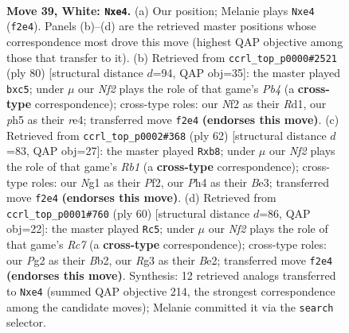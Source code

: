 \documentclass[11pt]{article}
\begin{document}
\clearpage

\begin{figure}[p]\centering
\begin{subfigure}{0.46\textwidth}\centering
\resizebox{\linewidth}{!}{%
\newchessgame
\chessboard[
  setfen={4rb2/3kn1pr/4n3/7p/P3b2P/6R1/5NP1/R2K2N1 w - - 0 39},
  showmover=false,
  pgfstyle=straightmove, color=movearrow, markmove={f2-e4}
]}
\caption{}
\end{subfigure}\hfill
\begin{subfigure}{0.46\textwidth}\centering
\resizebox{\linewidth}{!}{%
\newchessgame
\chessboard[
  setfen={6k1/6p1/4r2p/1Np5/1P1br3/5RPP/8/3R1K2 w - - 0 41},
  showmover=false,
  pgfstyle=straightmove, color=movearrow, markmove={b4-c5}
]}
\caption{}
\end{subfigure}
\\[4pt]
\begin{subfigure}{0.46\textwidth}\centering
\resizebox{\linewidth}{!}{%
\newchessgame
\chessboard[
  setfen={1r3nk1/3r2pp/p7/4b1P1/R7/4BN2/5P2/1R4K1 w - - 1 32},
  showmover=false,
  pgfstyle=straightmove, color=movearrow, markmove={b1-b8}
]}
\caption{}
\end{subfigure}\hfill
\begin{subfigure}{0.46\textwidth}\centering
\resizebox{\linewidth}{!}{%
\newchessgame
\chessboard[
  setfen={r4rk1/1pR2n1p/5Pp1/3b4/8/4R1P1/1B2B3/6K1 w - - 3 31},
  showmover=false,
  pgfstyle=straightmove, color=movearrow, markmove={c7-c5}
]}
\caption{}
\end{subfigure}
\caption{\textbf{Move 39, White: \texttt{Nxe4}.} (a) Our position; Melanie plays \texttt{Nxe4} (\texttt{f2e4}). Panels (b)--(d) are the retrieved master positions whose correspondence most drove this move (highest QAP objective among those that transfer to it). (b) Retrieved from \texttt{ccrl\_top\_p0000\#2521} (ply 80) [structural distance $d$=94, QAP obj=35]: the master played \texttt{bxc5}; under $\mu$ our \emph{Nf2} plays the role of that game's \emph{Pb4} (a \textbf{cross-type} correspondence); cross-type roles: our \emph{N}f2 as their \emph{R}d1, our \emph{p}h5 as their \emph{r}e4; transferred move \texttt{f2e4} \textbf{(endorses this move)}. (c) Retrieved from \texttt{ccrl\_top\_p0002\#368} (ply 62) [structural distance $d$=83, QAP obj=27]: the master played \texttt{Rxb8}; under $\mu$ our \emph{Nf2} plays the role of that game's \emph{Rb1} (a \textbf{cross-type} correspondence); cross-type roles: our \emph{N}g1 as their \emph{P}f2, our \emph{P}h4 as their \emph{B}e3; transferred move \texttt{f2e4} \textbf{(endorses this move)}. (d) Retrieved from \texttt{ccrl\_top\_p0001\#760} (ply 60) [structural distance $d$=86, QAP obj=22]: the master played \texttt{Rc5}; under $\mu$ our \emph{Nf2} plays the role of that game's \emph{Rc7} (a \textbf{cross-type} correspondence); cross-type roles: our \emph{P}g2 as their \emph{B}b2, our \emph{R}g3 as their \emph{B}e2; transferred move \texttt{f2e4} \textbf{(endorses this move)}. Synthesis: 12 retrieved analogs transferred to \texttt{Nxe4} (summed QAP objective 214, the strongest correspondence among the candidate moves); Melanie committed it via the \texttt{search} selector.}
\label{fig:thought-m76}
\end{figure}
\end{document}
